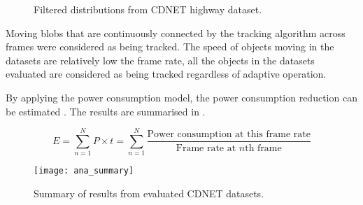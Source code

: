 \begin{figure}[htb]
  \centering
  \caption{Filtered distributions from CDNET highway dataset.}
  \label{ana:ada}
\end{figure}

Moving blobs that are continuously connected by the tracking algorithm across frames were considered as being tracked. The speed of objects moving in the datasets are relatively low  the frame rate, all the objects in the datasets evaluated are considered as being tracked regardless of adaptive operation.

By applying the power consumption model, the power consumption reduction can be estimated  . The results are summarised in .

\begin{equation}
	E = \sum_{n=1}^{N} P \times t = \sum_{n=1}^{N} \frac{\text{Power consumption at this frame rate}}{\text{Frame rate at } n \text{th frame}}
	\label{ana:eq:power}
\end{equation}

\begin{figure}[htb]
  \centering
  \texttt{[image: ana\_summary]}
  \caption{Summary of results from evaluated CDNET datasets.}
  \label{ana:summary}
\end{figure}
